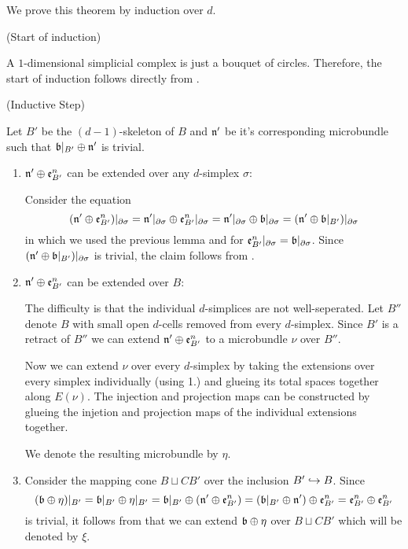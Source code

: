 \begin{myproof}
    We prove this theorem by induction over $d$.

    (Start of induction)

    A $1$-dimensional simplicial complex is just a bouquet of circles.
    Therefore, the start of induction follows directly from .   

    (Inductive Step)

    Let $B'$ be the $(d - 1)$-skeleton of $B$ and $\mathfrak{n}'$ be it's corresponding microbundle
    such that $\mathfrak{b}\vert_{B'} \oplus{} \mathfrak{n}'$ is trivial.

    \begin{enumerate}
        \item $\mathfrak{n}' \oplus{} \mathfrak{e}^{n}_{B'}$ can be extended over any $d$-simplex $\sigma$:

        Consider the equation
        \[
            (\mathfrak{n}' \oplus{} \mathfrak{e}^{n}_{B'})\vert_{\partial\sigma}
            = \mathfrak{n}'\vert_{\partial\sigma} \oplus{} \mathfrak{e}^{n}_{B'}\vert_{\partial\sigma}
            = \mathfrak{n}'\vert_{\partial\sigma} \oplus{} \mathfrak{b}\vert_{\partial\sigma}
            = (\mathfrak{n}' \oplus{} \mathfrak{b}\vert_{B'})\vert_{\partial\sigma}
        \]
        in which we used the previous lemma and 
        for $\mathfrak{e}^{n}_{B'}\vert_{\partial\sigma} = \mathfrak{b}\vert_{\partial\sigma}$.
        Since $(\mathfrak{n}' \oplus{} \mathfrak{b}\vert_{B'})\vert_{\partial\sigma}$ is trivial, the claim follows from .

        \item $\mathfrak{n}' \oplus{} \mathfrak{e}^{n}_{B'}$ can be extended over $B$:

        The difficulty is that the individual $d$-simplices are not well-seperated.
        Let $B''$ denote $B$ with small open $d$-cells removed from every $d$-simplex.
        Since $B'$ is a retract of $B''$ we can extend $\mathfrak{n}' \oplus{} \mathfrak{e}^{n}_{B'}$ to a microbundle $\nu$ over $B''$.

        Now we can extend $\nu$ over every $d$-simplex by taking the extensions
        over every simplex individually (using 1.) and glueing its total spaces together along $E(\nu)$.
        The injection and projection maps can be constructed
        by glueing the injetion and projection maps of the individual extensions together.

        We denote the resulting microbundle by $\eta$.

        \item
        Consider the mapping cone $B \sqcup CB'$ over the inclusion $B' \hookrightarrow{} B$.
        Since
        \[
            (\mathfrak{b} \oplus{} \eta)\vert_{B'}
            = \mathfrak{b}\vert_{B'} \oplus{} \eta\vert_{B'}
            = \mathfrak{b}\vert_{B'} \oplus{} (\mathfrak{n}' \oplus{} \mathfrak{e}^{n}_{B'})
            = (\mathfrak{b}\vert_{B'} \oplus{} \mathfrak{n}') \oplus{} \mathfrak{e}^{n}_{B'}
            = \mathfrak{e}^{n}_{B'} \oplus{} \mathfrak{e}^{n}_{B'}
        \]
        is trivial, it follows from  that we can extend $\mathfrak{b} \oplus{} \eta$ over $B \sqcup CB'$
        which will be denoted by $\xi$.


\end{enumerate}
\end{myproof}
